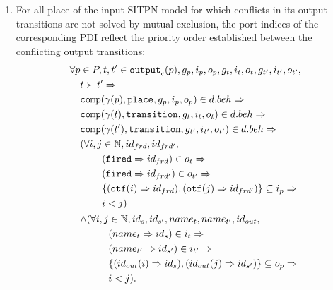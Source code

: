 \begin{definition}
  \begin{enumerate}[resume]
  \item\label{it:port-indices-ordering} For all place of the input
    SITPN model for which conflicts in its output transitions are not
    solved by mutual exclusion, the port indices of the corresponding
    PDI reflect the priority order established between the conflicting
    output transitions:
    \begin{equation*}
      \begin{aligned}[t]
        \forall{}p&\in{}P,t,t'\in{}\mathtt{output}_c(p),g_p,i_p,o_p,g_t,i_t,o_t,g_{t'},i_{t'},o_{t'}, \\
                  & t\succ{}t'\Rightarrow\\
                  & \mathtt{comp}(\gamma(p),\mathtt{place},g_p,i_p,o_p)\in{}d.beh\Rightarrow \\
                  & \mathtt{comp}(\gamma(t),\mathtt{transition},g_{t},i_{t},o_{t})\in{}d.beh\Rightarrow \\
                  & \mathtt{comp}(\gamma(t'),\mathtt{transition},g_{t'},i_{t'},o_{t'})\in{}d.beh\Rightarrow \\
                  &
                    \begin{aligned}[t]
                      (\forall{}i,j&\in\mathbb{N},id_{frd},id_{frd'}, \\
                                   & (\mathtt{fired}\Rightarrow{}id_{frd})\in{}o_t\Rightarrow \\
                                   & (\mathtt{fired}\Rightarrow{}id_{frd'})\in{}o_{t'}\Rightarrow \\
                                   & \{(\mathtt{otf}(i)\Rightarrow{}id_{frd}),(\mathtt{otf}(j)\Rightarrow{}id_{frd'})\}\subseteq{}i_p\Rightarrow \\
                                   & i<j) \\
                    \end{aligned} \\
                  & \begin{aligned}[t]
                      \land(\forall{}i,j&\in\mathbb{N},id_{s},id_{s'},name_t,name_{t'},id_{out}, \\
                                        & (name_t\Rightarrow{}id_{s})\in{}i_t\Rightarrow \\
                                        & (name_{t'}\Rightarrow{}id_{s'})\in{}i_{t'}\Rightarrow \\
                                        & \{(id_{out}(i)\Rightarrow{}id_s),(id_{out}(j)\Rightarrow{}id_{s'})\}\subseteq{}o_p\Rightarrow \\
                                        & i<j). \\
                    \end{aligned} \\
      \end{aligned}
    \end{equation*}
  \end{enumerate}


\end{definition}
